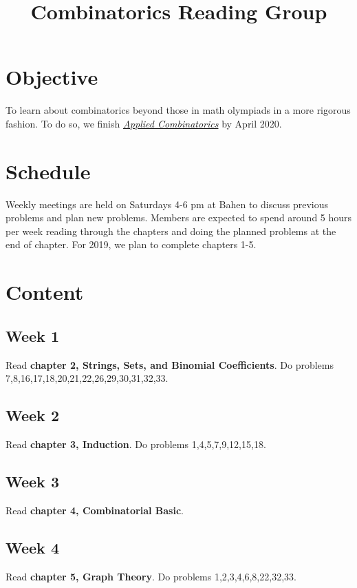 \documentclass[12pt]{article}
\begin{document}
	
	
\title{Combinatorics Reading Group}
\maketitle
	
\section{Objective}
To learn about combinatorics beyond those in math olympiads in a more rigorous fashion. To do so, we finish \textit{\href{https://open.umn.edu/opentextbooks/textbooks/applied-combinatorics}{Applied Combinatorics}} by April 2020.

\section{Schedule}
Weekly meetings are held on Saturdays 4-6 pm at Bahen to discuss previous problems and plan new problems. Members are expected to spend around 5 hours per week reading through the chapters and doing the planned problems at the end of chapter. For 2019, we plan to complete chapters 1-5.

\section{Content}
	\subsection{Week 1}
	Read \textbf{chapter 2, Strings, Sets, and Binomial Coefficients}. Do problems 7,8,16,17,18,20,21,22,26,29,30,31,32,33.

	\subsection{Week 2}
	Read \textbf{chapter 3, Induction}. Do problems 1,4,5,7,9,12,15,18.
	
	\subsection{Week 3}
	Read \textbf{chapter 4, Combinatorial Basic}.
	
	\subsection{Week 4}
	Read \textbf{chapter 5, Graph Theory}. Do problems 1,2,3,4,6,8,22,32,33.
\end{document}
